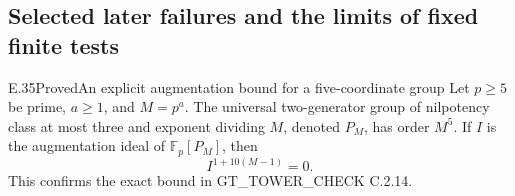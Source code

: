 \subsection{Selected later failures and the limits of fixed finite tests}

\begin{result}{E.35}{Proved}{An explicit augmentation bound for a five-coordinate group}
\label{coh:augmentation-bound}
Let $p\ge5$ be prime, $a\ge1$, and $M=p^a$.  The universal
two-generator group of nilpotency class at most three and exponent
dividing $M$, denoted $P_M$, has order $M^5$.  If $I$ is the
augmentation ideal of $\mathbb F_p[P_M]$, then
\[
                         I^{1+10(M-1)}=0.
 \tag{E.35.1}
\]
This confirms the exact bound in GT\_TOWER\_CHECK C.2.14.
\end{result}

